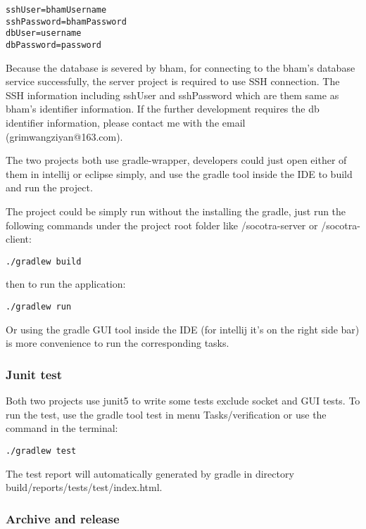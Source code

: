 \begin{lstlisting}
sshUser=bhamUsername
sshPassword=bhamPassword
dbUser=username
dbPassword=password
\end{lstlisting}

Because the database is severed by bham, for connecting to the bham's database service successfully, the server project is required to use SSH connection. The SSH information including sshUser and sshPassword which are them same as bham's identifier information. If the further development requires the db identifier information, please contact me with the email (grimwangziyan@163.com).

The two projects both use gradle-wrapper, developers could just open either of them in intellij or eclipse simply, and use the gradle tool inside the IDE to build and run the project.

The project could be simply run without the installing the gradle, just run the following commands under the project root folder like /socotra-server or /socotra-client:

\begin{lstlisting}
./gradlew build
\end{lstlisting}

then to run the application:

\begin{lstlisting}
./gradlew run
\end{lstlisting}

Or using the gradle GUI tool inside the IDE (for intellij it's on the right side bar) is more convenience to run the corresponding tasks.

\subsubsection{Junit test}

Both two projects use junit5 to write some tests exclude socket and GUI tests. To run the test, use the gradle tool test in menu Tasks/verification or use the command in the terminal:

\begin{lstlisting}
./gradlew test
\end{lstlisting}

The test report will automatically generated by gradle in directory build/reports/tests/test/index.html.

\subsubsection{Archive and release}

